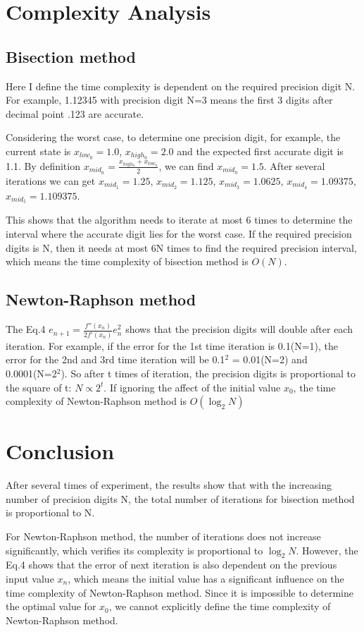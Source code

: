 \documentclass[a4paper]{scrartcl}
\begin{document}
\section{Complexity Analysis}
\label{sec:orgda7b128}

\subsection{Bisection method}
\label{sec:org5d6b0b0}
Here I define the time complexity is dependent on the required precision
digit N. For example, 1.12345 with precision digit N=3 means the first 3
digits after decimal point .123 are accurate.

Considering the worst case, to determine one precision digit, for example,
the current state is \(x_{low_0} = 1.0\), \(x_{high_0} = 2.0\) and the expected
first accurate digit is 1.1. By definition \(x_{mid_n} = \frac{x_{high_n} +
   x_{low_n}}{2}\), we can find \(x_{mid_0} = 1.5\). After several iterations we
can get \(x_{mid_1} = 1.25\), \(x_{mid_2} = 1.125\), \(x_{mid_3} = 1.0625\),
\(x_{mid_4} = 1.09375\), \(x_{mid_5} = 1.109375\).

This shows that the algorithm needs to iterate at most 6 times to determine
the interval where the accurate digit lies for the worst case. If the
required precision digits is N, then it needs at most 6N times to find the
required precision interval, which means the time complexity of bisection
method is \(O(N)\).

\subsection{Newton-Raphson method}
\label{sec:orgbad55a3}
The Eq.4 \(e_{n+1} = \frac{f''(x_n)}{2f'(x_n)}e^2_n\) shows that the precision
digits will double after each iteration. For example, if the error for the
1st time iteration is 0.1(N=1), the error for the 2nd and 3rd time iteration
will be 0.1\(^{\text{2}}\) = 0.01(N=2) and 0.0001(N=2\(^{\text{2}}\)). So after t times of iteration,
the precision digits is proportional to the square of t: \(N \propto 2^t\). If
ignoring the affect of the initial value \(x_0\), the time complexity of
Newton-Raphson method is \(O(\log_2 N)\)

\section{Conclusion}
\label{sec:org6745239}
After several times of experiment, the results show that with the increasing
number of precision digits N, the total number of iterations for
bisection method is proportional to N. 

For Newton-Raphson method, the number of iterations does not increase
significantly, which verifies its complexity is proportional to \(\log_2 N\).
However, the Eq.4 shows that the error of next iteration is also dependent on
the previous input value \(x_n\), which means the initial value has a
significant influence on the time complexity of Newton-Raphson method. Since
it is impossible to determine the optimal value for \(x_0\), we cannot
explicitly define the time complexity of Newton-Raphson method.
\end{document}
